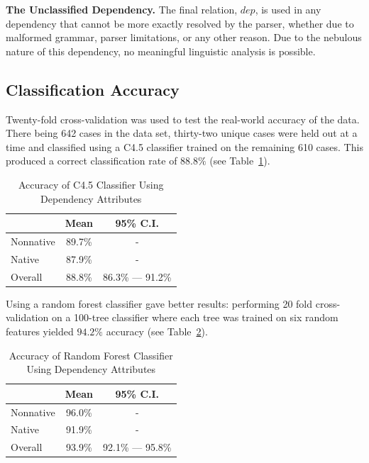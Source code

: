 \documentclass[main.tex]{subfiles}
\begin{document}

\textbf{The Unclassified Dependency.} The final relation, $dep$, is used in any dependency that cannot be more exactly resolved by the parser, whether due to malformed grammar, parser limitations, or any other reason. Due to the nebulous nature of this dependency, no meaningful linguistic analysis is possible. 

\subsection{Classification Accuracy}

Twenty-fold cross-validation was used to test the real-world accuracy of the data. There being 642 cases in the data set, thirty-two unique cases were held out at a time and classified using a C4.5 classifier trained on the remaining 610 cases. This produced a correct classification rate of $88.8\%$ (see Table~\ref{table:dep-results-c45}).
\begin{table}[t]
\centering
\caption{Accuracy of C4.5 Classifier Using Dependency Attributes}
\begin{tabular}{l c c}
\toprule
& Mean & 95\% C.I.\\
\midrule
Nonnative & 89.7\% & - \\
[6pt]Native & 87.9\% & - \\
[6pt]Overall & 88.8\% & 86.3\% --- 91.2\% \\
\bottomrule
\end{tabular}
\label{table:dep-results-c45}
\end{table}
Using a random forest classifier gave better results: performing 20 fold cross-validation on a 100-tree classifier where each tree was trained on six random features yielded $94.2\%$ accuracy (see Table~\ref{table:dep-results-rf}).

\begin{table}[t]
\centering
\caption{Accuracy of Random Forest Classifier Using Dependency Attributes}
\begin{tabular}{l c c}
\toprule
& Mean & 95\% C.I.\\
\midrule
Nonnative & 96.0\% & - \\
[6pt]Native & 91.9\% & - \\
[6pt]Overall & 93.9\% & 92.1\% --- 95.8\% \\
\bottomrule
\end{tabular}
\label{table:dep-results-rf}
\end{table}

\vfill

\biblio
\end{document}
